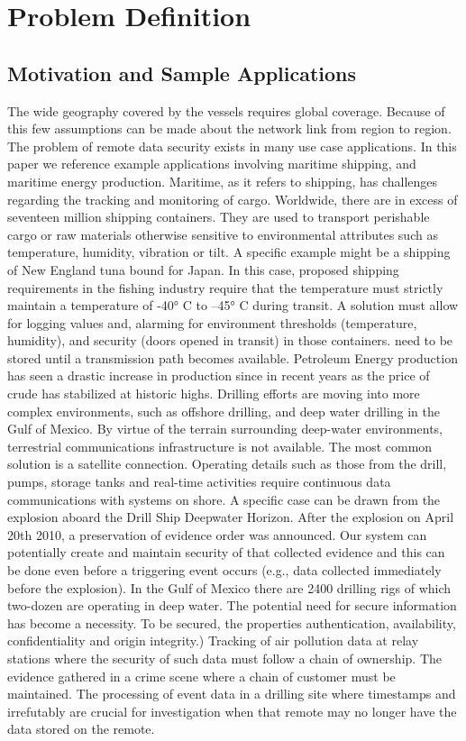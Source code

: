 \chapter{Problem Definition} 
\section{Motivation and Sample Applications}
The wide geography covered by the vessels requires global coverage. Because of this few assumptions can be made about the network link from region to region. 
The problem of remote data security exists in many use case applications. In this paper we reference example applications involving maritime shipping, and maritime energy production. Maritime, as it refers to shipping, has challenges regarding the tracking and monitoring of cargo. Worldwide, there are in excess of seventeen million shipping containers.\cite{Levinson:2010wm} They are used to transport perishable cargo or raw materials otherwise sensitive to environmental attributes such as temperature, humidity, vibration or tilt. 
A specific example might be a shipping of New England tuna bound for Japan. In this case, proposed shipping requirements in the fishing industry require that the temperature must strictly maintain a temperature of -40° C to –45° C during transit. A solution must allow for logging values and, alarming for environment thresholds (temperature, humidity), and security (doors opened in transit) in those containers. need to be stored until a transmission path becomes available.
Petroleum Energy production has seen a drastic increase in production since in recent years as the price of crude has stabilized at historic highs.\cite{Anonymous:ko4JQlUG} Drilling efforts are moving into more complex environments, such as offshore drilling, and deep water drilling in the Gulf of Mexico. By virtue of the terrain surrounding deep-water environments, terrestrial communications infrastructure is not available. The most common solution is a satellite connection. Operating details such as those from the drill, pumps, storage tanks and real-time activities require continuous data communications with systems on shore. A specific case can be drawn from the explosion aboard the Drill Ship Deepwater Horizon. After the explosion on April 20th 2010, a preservation of evidence order \cite{Fenton:2011kq}was announced. Our system can potentially create and maintain security of that collected evidence and this can be done even before a triggering event occurs (e.g., data collected immediately before the explosion). In the Gulf of Mexico there are 2400 drilling rigs of which two-dozen are operating in deep water\cite{Anonymous:ko4JQlUG}. The potential need for secure information has become a necessity. To be secured, the properties authentication, availability, confidentiality and origin integrity.)
Tracking of air pollution data at relay stations where the security of such data must follow a chain of ownership.  The evidence gathered in a crime scene where a chain of customer must be maintained.\cite{Group:2006en}  The processing of event data in a drilling site where timestamps and irrefutably are crucial for investigation when that remote may no longer have the data stored on the remote. 

